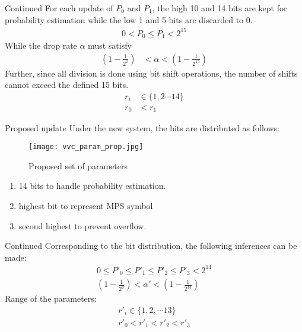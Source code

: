 \documentclass{beamer}
\providecommand{\brak}[1]{\ensuremath{\left(#1\right)}}
\begin{document}
\begin{frame}{Continued}
    For each update of $P_0$ and $P_1$, the high 10 and 14 bits are kept for probability estimation while the low 1 and 5 bits are discarded to 0.
\begin{align}
    0<P_0\leq P_1< 2^{15}
\end{align}
While the drop rate $\alpha$ must satisfy
\begin{align}
        \brak{1-\frac{1}{2^0}}&<\alpha<\brak{1-\frac{1}{2^{15}}}
\end{align}
Further, since all division is done using bit shift operations, the number of shifts cannot exceed the defined 15 bits. 
\begin{align}
    r_i&\in \{1,2\cdots 14\}\\
    r_0&<r_1
\end{align}
\end{frame}
\begin{frame}{Proposed update}
Under the new system, the bits are distributed as follows:
\begin{figure}
    \centering
    \texttt{[image: vvc\_param\_prop.jpg]}
    \caption{Proposed set of parameters}
    \label{fig:proposed_vvc}
\end{figure}
\begin{enumerate}[]
    \item 14 bits to handle probability estimation.
    \item highest bit to represent MPS symbol
    \item second highest to prevent overflow.
\end{enumerate}
\end{frame}
\begin{frame}{Continued}
Corresponding to the bit distribution, the following inferences can be made:
    \begin{align}
        0\leq {P'}_0\leq {P'}_1\leq {P'}_2\leq {P'}_3<2^{14}\\
        \brak{1-\frac{1}{2^0}}<\alpha '<\brak{1-\frac{1}{2^{14}}}
    \end{align}
    Range of the parameters: 
    \begin{align}
        r'_i \in \{1,2,\cdots 13\}\\
        r'_0<r'_1<r'_2<r'_3
    \end{align}
\end{frame}
\end{document}
